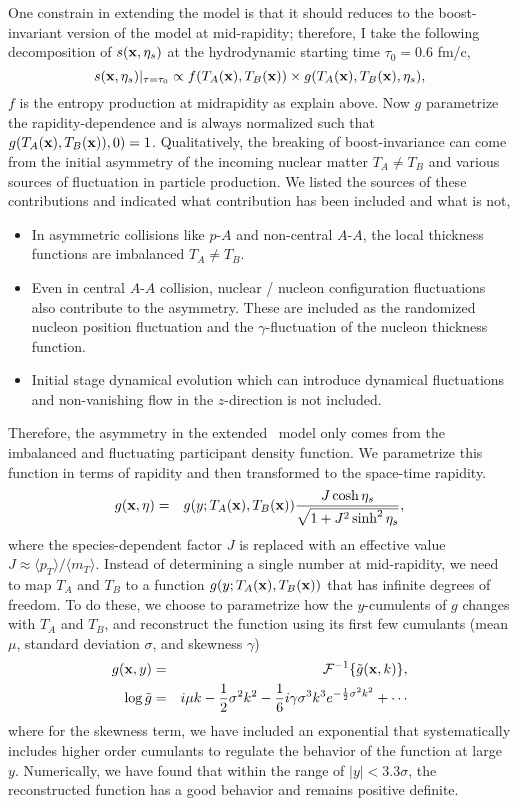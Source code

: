 One constrain in extending the model is that it should reduces to the boost-invariant version of the model at mid-rapidity; therefore, I take the following decomposition of $s(\mathbf x, \eta_s)$ at the hydrodynamic starting time $\tau_0 = 0.6$ fm/c,
\begin{equation}
  s(\mathbf x, \eta_s)\vert_{\tau=\tau_0} \propto f(T_A(\mathbf x), T_B(\mathbf x)) \times g(T_A(\mathbf x), T_B(\mathbf x), \eta_s),
  \label{factorized}
\end{equation}
$f$ is the entropy production at midrapidity as explain above.
Now $g$ parametrize the rapidity-dependence and is always normalized such that $g(T_A(\mathbf x), T_B(\mathbf x)), 0)=1$.
Qualitatively, the breaking of boost-invariance can come from the initial asymmetry of the incoming nuclear matter $T_A \neq T_B$ and various sources of fluctuation in particle production.
We listed the sources of these contributions and indicated what contribution has been included and what is not,
\begin{itemize}
\item In asymmetric collisions like $p$-$A$ and non-central $A$-$A$, the local thickness functions are imbalanced $T_A \neq T_B$.
\item Even in central $A$-$A$ collision, nuclear / nucleon configuration fluctuations also contribute to the asymmetry. These are included as the randomized nucleon position fluctuation and the $\gamma$-fluctuation of the nucleon thickness function.
\item Initial stage dynamical evolution which can introduce dynamical fluctuations and non-vanishing flow in the $z$-direction is not included.
\end{itemize}
Therefore, the asymmetry in the extended \trento\ model only comes from the imbalanced and fluctuating participant density function.
We parametrize this function in terms of rapidity and then transformed to the space-time rapidity.
\begin{eqnarray}
g(\mathbf x, \eta) &=& g(y; T_A(\mathbf x), T_B(\mathbf x)) \frac{J \cosh \eta_s}{\sqrt{1 + J^2 \sinh^2 \eta_s}},
\label{jacobian}
\end{eqnarray}
where the species-dependent factor $J$ is replaced with an effective value $J \approx \langle p_T \rangle / \langle m_T \rangle$.
Instead of determining a single number at mid-rapidity, we need to map $T_A$ and $T_B$ to a function $g(y; T_A(\mathbf x), T_B(\mathbf x))$ that has infinite degrees of freedom.
To do these, we choose to parametrize how the $y$-cumulents of $g$ changes with $T_A$ and $T_B$, and reconstruct the function using its first few cumulants (mean $\mu$, standard deviation $\sigma$, and skewness $\gamma$)
\begin{eqnarray}
g(\mathbf x, y) &=& \mathcal{F}^{-1}\{\tilde{g}(\mathbf x, k)\}, \\
\log \tilde{g} &=&  i \mu k - \frac{1}{2}\sigma^2 k^2 - \frac{1}{6} i \gamma \sigma^3 k^3  e^{-\frac{1}{2}\sigma^2 k^2} + \cdots \label{cgf}
\end{eqnarray}
where for the skewness term, we have included an exponential that systematically includes higher order cumulants to regulate the behavior of the function at large $y$.
Numerically, we have found that within the range of $|y| < 3.3\sigma$, the reconstructed function has a good behavior and remains positive definite.

